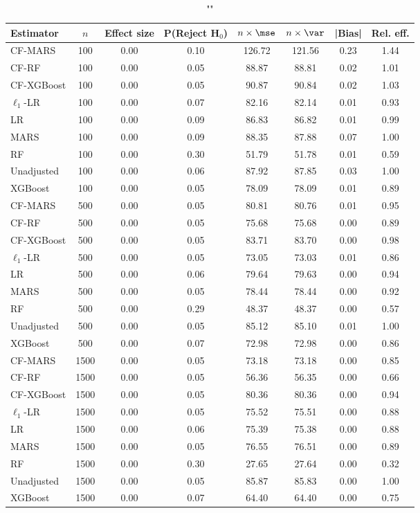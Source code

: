 \begin{table}
\centering
\caption{""}
\begin{tabular}{lccccccc}
\toprule
Estimator & $n$ & Effect size & P(Reject H$_0$) & $n\times\mse$ & $n\times \var$ & |Bias| & Rel. eff.\\ \midrule
CF-MARS & 100 & 0.00 & 0.10 & 126.72 & 121.56 & 0.23 & 1.44 \\ 
CF-RF & 100 & 0.00 & 0.05 &  88.87 &  88.81 & 0.02 & 1.01 \\ 
CF-XGBoost & 100 & 0.00 & 0.05 &  90.87 &  90.84 & 0.02 & 1.03 \\ 
$\ell_1$-LR & 100 & 0.00 & 0.07 &  82.16 &  82.14 & 0.01 & 0.93 \\ 
LR & 100 & 0.00 & 0.09 &  86.83 &  86.82 & 0.01 & 0.99 \\ 
MARS & 100 & 0.00 & 0.09 &  88.35 &  87.88 & 0.07 & 1.00 \\ 
RF & 100 & 0.00 & 0.30 &  51.79 &  51.78 & 0.01 & 0.59 \\ 
Unadjusted & 100 & 0.00 & 0.06 &  87.92 &  87.85 & 0.03 & 1.00 \\ 
XGBoost & 100 & 0.00 & 0.05 &  78.09 &  78.09 & 0.01 & 0.89 \\ \addlinespace 
CF-MARS & 500 & 0.00 & 0.05 &  80.81 &  80.76 & 0.01 & 0.95 \\ 
CF-RF & 500 & 0.00 & 0.05 &  75.68 &  75.68 & 0.00 & 0.89 \\ 
CF-XGBoost & 500 & 0.00 & 0.05 &  83.71 &  83.70 & 0.00 & 0.98 \\ 
$\ell_1$-LR & 500 & 0.00 & 0.05 &  73.05 &  73.03 & 0.01 & 0.86 \\ 
LR & 500 & 0.00 & 0.06 &  79.64 &  79.63 & 0.00 & 0.94 \\ 
MARS & 500 & 0.00 & 0.05 &  78.44 &  78.44 & 0.00 & 0.92 \\ 
RF & 500 & 0.00 & 0.29 &  48.37 &  48.37 & 0.00 & 0.57 \\ 
Unadjusted & 500 & 0.00 & 0.05 &  85.12 &  85.10 & 0.01 & 1.00 \\ 
XGBoost & 500 & 0.00 & 0.07 &  72.98 &  72.98 & 0.00 & 0.86 \\ \addlinespace 
CF-MARS & 1500 & 0.00 & 0.05 &  73.18 &  73.18 & 0.00 & 0.85 \\ 
CF-RF & 1500 & 0.00 & 0.05 &  56.36 &  56.35 & 0.00 & 0.66 \\ 
CF-XGBoost & 1500 & 0.00 & 0.05 &  80.36 &  80.36 & 0.00 & 0.94 \\ 
$\ell_1$-LR & 1500 & 0.00 & 0.05 &  75.52 &  75.51 & 0.00 & 0.88 \\ 
LR & 1500 & 0.00 & 0.06 &  75.39 &  75.38 & 0.00 & 0.88 \\ 
MARS & 1500 & 0.00 & 0.05 &  76.55 &  76.51 & 0.00 & 0.89 \\ 
RF & 1500 & 0.00 & 0.30 &  27.65 &  27.64 & 0.00 & 0.32 \\ 
Unadjusted & 1500 & 0.00 & 0.05 &  85.87 &  85.83 & 0.00 & 1.00 \\ 
XGBoost & 1500 & 0.00 & 0.07 &  64.40 &  64.40 & 0.00 & 0.75 \\
\bottomrule
\end{tabular}
\end{table}

